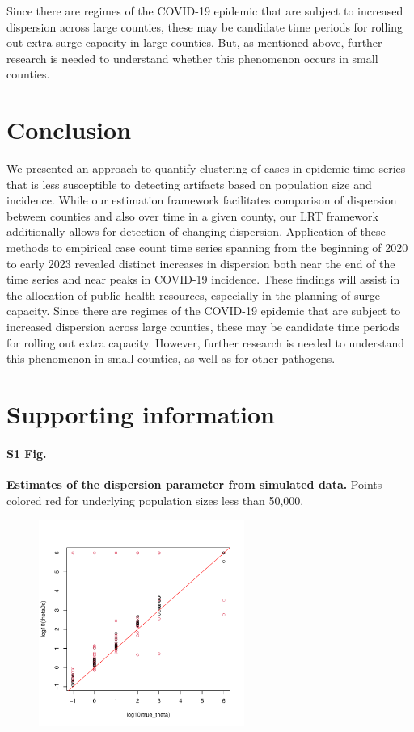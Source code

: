 \documentclass[10pt,letterpaper]{article}
\begin{document}
Since there are regimes of the COVID-19 epidemic that are subject to increased dispersion across large counties, these may be candidate time periods for rolling out extra surge capacity in large counties. 
But, as mentioned above, further research is needed to understand whether this phenomenon occurs in small counties. 

\section*{Conclusion}
We presented an approach to quantify clustering of cases in epidemic time series that is less susceptible to detecting artifacts based on population size and incidence. 
While our estimation framework facilitates comparison of dispersion between counties and also over time in a given county, our LRT framework additionally allows for detection of changing dispersion. 
Application of these methods to empirical case count time series spanning from the beginning of 2020 to early 2023 revealed distinct increases in dispersion both near the end of the time series and near peaks in COVID-19 incidence. 
These findings will assist in the allocation of public health resources, especially in the planning of surge capacity. 
Since there are regimes of the COVID-19 epidemic that are subject to increased dispersion across large counties, these may be candidate time periods for rolling out extra capacity. 
However, further research is needed to understand this phenomenon in small counties, as well as for other pathogens.

\section*{Supporting information}

\paragraph*{S1 Fig.}
\label{S1_Fig}
{\bf Estimates of the dispersion parameter from simulated data.} Points colored red for underlying population sizes less than 50,000.
\begin{figure}[!h]
\centering
\includegraphics[width=0.6\textwidth]{thetaest_v_theta.pdf}
\label{S1}
\end{figure}
\end{document}
